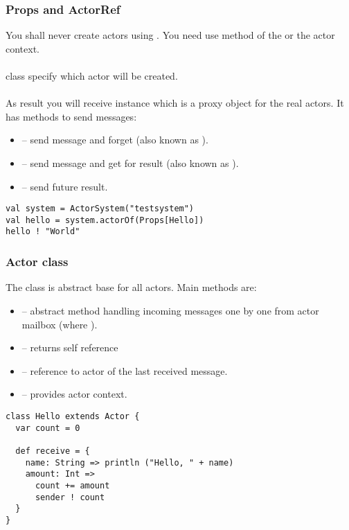 \begin{frame}[fragile]
\frametitle{Props and ActorRef}
You shall never create actors using . You need use  method of the
 or the actor context.\\~\\

 class specify which actor will be created.\\~\\

As result you will receive  instance which is a proxy object for the real actors.
It has methods to send messages:
\begin{itemize}
\item \linline{!} -- send message and forget (also known as ).
\item {} -- send message and get  for result (also known as ).
\item {} -- send future result.
\end{itemize}
\begin{example}
\begin{lstlisting}
val system = ActorSystem("testsystem")
val hello = system.actorOf(Props[Hello])
hello ! "World"
\end{lstlisting}
\end{example}
\end{frame}

\begin{frame}[fragile]
\frametitle{Actor class}
The  class is abstract base for all actors. Main methods are:
\begin{itemize}
  \item {} -- abstract method handling incoming messages one by one
    from actor mailbox
    (where ).
  \item {} -- returns self reference
  \item {} -- reference to actor of the last received message.
  \item {} -- provides actor context.
\end{itemize}
\begin{lstlisting}
class Hello extends Actor {
  var count = 0

  def receive = {
    name: String => println ("Hello, " + name)
    amount: Int =>
      count += amount
      sender ! count
  }
}
\end{lstlisting}
\end{frame}


